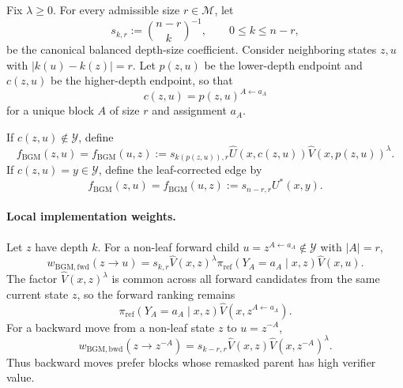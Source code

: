 \documentclass{article}
\numberwithin{theorem}{section}
\numberwithin{proposition}{section}
\numberwithin{corollary}{section}
\numberwithin{lemma}{section}
\numberwithin{conjecture}{section}
\numberwithin{remark}{section}
\numberwithin{definition}{section}
\numberwithin{assumption}{section}
\numberwithin{example}{section}
\newcommand{\calM}{{\mathcal{M}}}
\newcommand{\calY}{{\mathcal{Y}}}
\newcommand{\abs}[1]{\left| #1\right|}
\providecommand{\base}{\pi_{\mathrm{ref}}}
\begin{document}
\begin{definition}
\label{def:bg_mdm_edge_weights}
Fix $\lambda\ge0$. For every admissible size $r\in\calM$, let
\begin{equation*}
    s_{k,r}:=\binom{n-r}{k}^{-1},\qquad 0\le k\le n-r,
\end{equation*}
be the canonical balanced depth-size coefficient. Consider neighboring states $z,u$ with $\abs{k(u)-k(z)}=r$. Let $p(z,u)$ be the lower-depth endpoint and $c(z,u)$ be the higher-depth endpoint, so that
\begin{equation*}
    c(z,u)=p(z,u)^{A\leftarrow a_A}
\end{equation*}
for a unique block $A$ of size $r$ and assignment $a_A$.

If $c(z,u)\notin\calY$, define
\begin{equation*}
    f_{\mathrm{BGM}}(z,u)=f_{\mathrm{BGM}}(u,z):=
    s_{k(p(z,u)),r}\widehat U(x,c(z,u))\widehat V(x,p(z,u))^\lambda.
\end{equation*}
If $c(z,u)=y\in\calY$, define the leaf-corrected edge by
\begin{equation*}
    f_{\mathrm{BGM}}(z,u)=f_{\mathrm{BGM}}(u,z):=s_{n-r,r}U^*(x,y).
\end{equation*}
\end{definition}

\paragraph{Local implementation weights.}
Let $z$ have depth $k$. For a non-leaf forward child $u=z^{A\leftarrow a_A}\notin\calY$ with $\abs{A}=r$,
\begin{equation*}
\label{eq:bg_mdm_fwd_weight}
    w_{\mathrm{BGM,fwd}}(z\to u)=s_{k,r}\widehat V(x,z)^\lambda\base(Y_A=a_A\mid x,z)\widehat V(x,u).
\end{equation*}
The factor $\widehat V(x,z)^\lambda$ is common across all forward candidates from the same current state $z$, so the forward ranking remains
\begin{equation*}
    \base(Y_A=a_A\mid x,z)\widehat V(x,z^{A\leftarrow a_A}).
\end{equation*}
For a backward move from a non-leaf state $z$ to $u=z^{-A}$,
\begin{equation*}
\label{eq:bg_mdm_bwd_weight}
    w_{\mathrm{BGM,bwd}}(z\to z^{-A})=s_{k-r,r}\widehat V(x,z)\widehat V(x,z^{-A})^\lambda.
\end{equation*}
Thus backward moves prefer blocks whose remasked parent has high verifier value.
\end{document}

